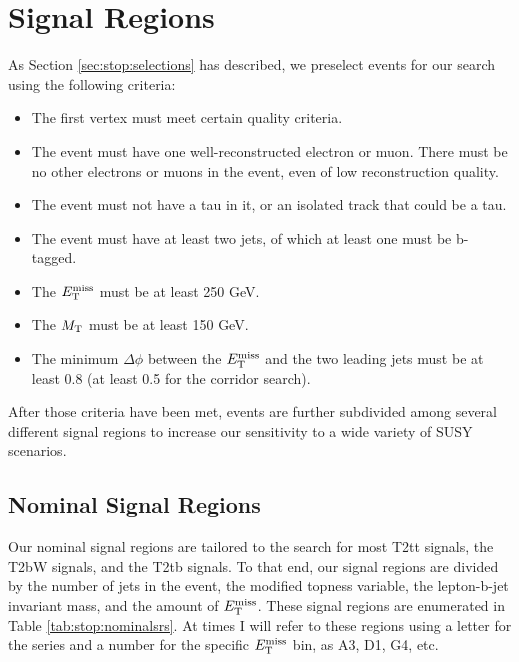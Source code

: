 \section{Signal Regions}
\label{sec:stop:sigregs}

As Section \ref{sec:stop:selections} has described, we preselect events
for our search using the following criteria:
\begin{itemize}
\item The first vertex must meet certain quality criteria.
\item The event must have one well-reconstructed electron or
  muon. There must be no other electrons or muons in the event, even
  of low reconstruction quality.
\item The event must not have a tau in it, or an isolated track that
  could be a tau.
\item The event must have at least two jets, of which at least one
  must be b-tagged.
\item The $E_\text{T}^\text{miss}$ must be at least 250 GeV.
\item The $M_\text{T}$ must be at least 150 GeV.
\item The minimum $\Delta \phi$ between the $E_\text{T}^\text{miss}$ and the two leading
  jets must be at least 0.8 (at least 0.5 for the corridor search).
\end{itemize}
After those criteria have been met, events are further subdivided
among several different signal regions to increase our sensitivity to
a wide variety of SUSY scenarios.

\subsection{Nominal Signal Regions}
\label{ssec:stop:sigregsnominal}

Our nominal signal regions are tailored to the search for most T2tt
signals, the T2bW signals, and the T2tb signals. To that end, our
signal regions are divided by the number of jets in the event, the
modified topness variable, the lepton-b-jet invariant mass, and the
amount of $E_\text{T}^\text{miss}$. These signal regions are enumerated in Table
\ref{tab:stop:nominalsrs}. At times I will refer to these regions using a
letter for the series and a number for the specific $E_\text{T}^\text{miss}$ bin, as
A3, D1, G4, etc.

